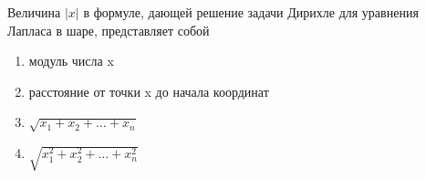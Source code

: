 Величина \(|x|\) в формуле, дающей решение задачи Дирихле для уравнения Лапласа в шаре, представляет собой

\begin{enumerate}[label=\arabic*)]
    \item модуль числа x
    \item расстояние от точки x до начала координат
    \item \(\sqrt{x_1+x_2+\dots +x_n}\)
    \item \(\sqrt{x_1^2+x_2^2+\dots +x_n^2}\)
\end{enumerate}

